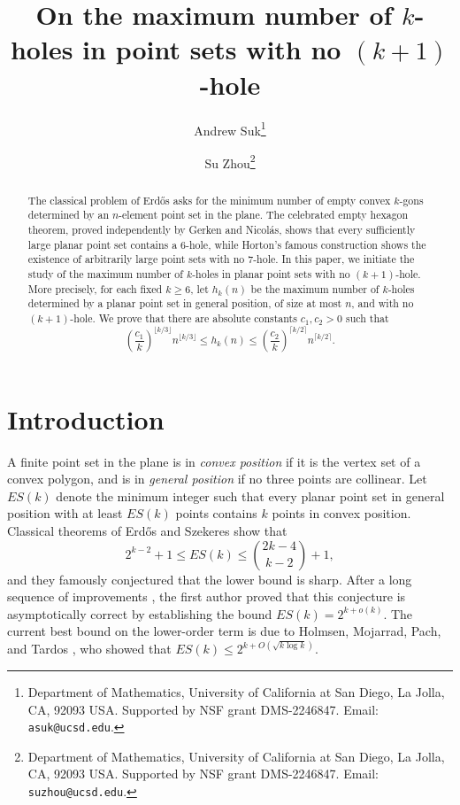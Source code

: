\documentclass[11pt]{article}
\date{}
\title{On the maximum number of $k$-holes in point sets with no $(k + 1)$-hole}
\theoremstyle{plain}
\theoremstyle{definition}
\theoremstyle{remark}
\begin{document}
\author{Andrew Suk\thanks{Department of Mathematics, University of California at San Diego, La Jolla, CA, 92093 USA. Supported by NSF grant DMS-2246847. Email: {\tt asuk@ucsd.edu}.}  \and Su Zhou\thanks{Department of Mathematics, University of California at San Diego, La Jolla, CA, 92093 USA. Supported by NSF grant DMS-2246847. Email: {\tt suzhou@ucsd.edu}.} }


\maketitle
\begin{abstract}
The classical problem of Erd\H{o}s asks for the minimum number of empty convex \(k\)-gons determined by an \(n\)-element point set in the plane. The celebrated empty hexagon theorem, proved independently by Gerken and Nicol\'as, shows that every sufficiently large planar point set contains a 6-hole, while Horton’s famous construction shows the existence of arbitrarily large point sets with no 7-hole. In this paper, we initiate the study of the maximum number of \(k\)-holes in planar point sets with no \((k+1)\)-hole. More precisely, for each fixed \(k\ge 6\), let \(h_k(n)\) be the maximum number of \(k\)-holes determined by a planar point set in general position, of size at most \(n\), and with no \((k+1)\)-hole. We prove that there are absolute constants $c_1,c_2>0$ such that
\[
\left(\frac{c_1}{k}\right)^{\lfloor k/3\rfloor} n^{\lfloor k/3\rfloor}
\le h_k(n)\le
\left(\frac{c_2}{k}\right)^{\lceil k/2\rceil} n^{\lceil k/2\rceil}.
\]
\end{abstract}
 
\section{Introduction}

A finite point set in the plane is in \emph{convex position} if it is the vertex set of a convex polygon, and is in \emph{general position} if no three points are collinear. Let \(ES(k)\) denote the minimum integer such that every planar point set in general position with at least \(ES(k)\) points contains \(k\) points in convex position. Classical theorems of Erd\H{o}s and Szekeres \cite{ES35,es2} show that
\[
2^{k-2}+1\le ES(k)\le \binom{2k-4}{k-2}+1,
\]
and they famously conjectured that the lower bound is sharp. After a long sequence of improvements \cite{CG,KP,TV1,TV2}, the first author \cite{S} proved that this conjecture is asymptotically correct by establishing the bound \(ES(k)=2^{k+o(k)}\). The current best bound on the lower-order term is due to Holmsen, Mojarrad, Pach, and Tardos \cite{holm}, who showed that $
ES(k)\le 2^{k+O(\sqrt{k\log k})}.$
\end{document}
